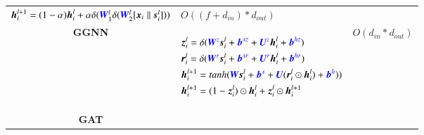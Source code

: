 \begin{table}
\begin{footnotesize}
\begin{tabular}{cp{20em}r}
            $\boldsymbol{h}_i^{l+1} = (1 - \alpha)  \boldsymbol{h}_i^l +\alpha    \delta(\textcolor{blue}{\boldsymbol{W}}^l_1 \delta(\textcolor{blue}{\boldsymbol{W}}^l_2 [\boldsymbol{x}_i \parallel \boldsymbol{s}_i^l]))$ &
            $O((f + d_{in}) * d_{out})$                                                                                                                                                                                        \\
            \textbf{GGNN}    \cite{li2015_ggnn}                                                                                                                                                                              &
            \begin{scriptsize}
                $\begin{aligned}[t]
                         & {\boldsymbol{z}}_i^l = \delta ( \textcolor{blue}{\boldsymbol{W}^z} \boldsymbol{s}_i^l + \textcolor{blue}{\boldsymbol{b}^{sz}} + \textcolor{blue}{\boldsymbol{U}^z} \boldsymbol{h}_i^{l} + \textcolor{blue}{\boldsymbol{b}^{hz}})                    \\
                         & \boldsymbol{r}_i^l = \delta ( \textcolor{blue}{\boldsymbol{W}^r} \boldsymbol{s}_i^l+ \textcolor{blue}{\boldsymbol{b}^{sr}} +\textcolor{blue}{\boldsymbol{U}^r} \boldsymbol{h}_i^{l} + \textcolor{blue}{\boldsymbol{b}^{hr}})                        \\
                         & \boldsymbol{h}_i^{l+1} = tanh ( \textcolor{blue}{\boldsymbol{W}} \boldsymbol{s}_i^l + \textcolor{blue}{\boldsymbol{b}^s} + \textcolor{blue}{\boldsymbol{U}} ( \boldsymbol{r}_i^l \odot \boldsymbol{h}_i^{l}) + \textcolor{blue}{\boldsymbol{b}^h})) \\
                         & \boldsymbol{h}_i^{l+1} = (1 - {\boldsymbol{z}}_i^l) \odot \boldsymbol{h}_i^l + {\boldsymbol{z}}_i^l \odot \boldsymbol{h}_i^{l+1}
                    \end{aligned}$
            \end{scriptsize}
                                                                                                                                                                                                                             &
            $O(d_{in} * d_{out})$                                                                                                                                                                                              \\
            \textbf{GAT} \cite{huang2018_gat}                                                                                                                                                                                &

\end{tabular}
\end{footnotesize}
\end{table}
